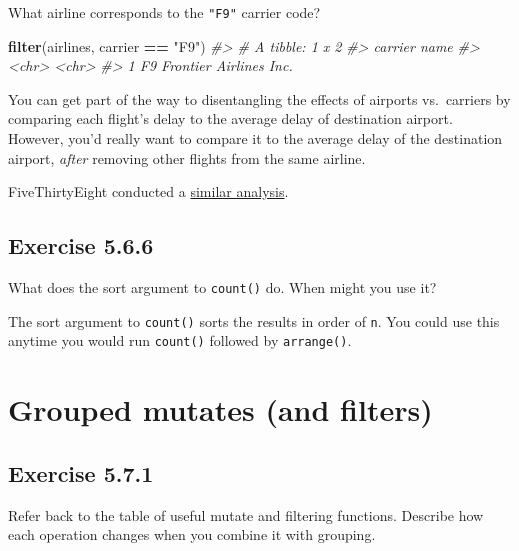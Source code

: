 \documentclass[]{book}
\newenvironment{Shaded}{\begin{snugshade}}{\end{snugshade}}
\newcommand{\CommentTok}[1]{\textcolor[rgb]{0.56,0.35,0.01}{\textit{#1}}}
\newcommand{\KeywordTok}[1]{\textcolor[rgb]{0.13,0.29,0.53}{\textbf{#1}}}
\newcommand{\NormalTok}[1]{#1}
\newcommand{\OperatorTok}[1]{\textcolor[rgb]{0.81,0.36,0.00}{\textbf{#1}}}
\newcommand{\StringTok}[1]{\textcolor[rgb]{0.31,0.60,0.02}{#1}}
\theoremstyle{plain}
\theoremstyle{remark}
\theoremstyle{definition}
\theoremstyle{definition}
\theoremstyle{definition}
\theoremstyle{remark}
\begin{document}
What airline corresponds to the \texttt{"F9"} carrier code?

\begin{Shaded}
\begin{Highlighting}[]
\KeywordTok{filter}\NormalTok{(airlines, carrier }\OperatorTok{==}\StringTok{ "F9"}\NormalTok{)}
\CommentTok{#> # A tibble: 1 x 2}
\CommentTok{#>   carrier name                  }
\CommentTok{#>   <chr>   <chr>                 }
\CommentTok{#> 1 F9      Frontier Airlines Inc.}
\end{Highlighting}
\end{Shaded}

You can get part of the way to disentangling the effects of airports
vs.~carriers by comparing each flight's delay to the average delay of
destination airport. However, you'd really want to compare it to the
average delay of the destination airport, \emph{after} removing other
flights from the same airline.

FiveThirtyEight conducted a
\href{http://fivethirtyeight.com/features/the-best-and-worst-airlines-airports-and-flights-summer-2015-update/}{similar
analysis}.

\hypertarget{exercise-5.6.6}{%
\subsection*{\texorpdfstring{Exercise
{5.6.6}}{Exercise 5.6.6}}\label{exercise-5.6.6}}

What does the sort argument to \texttt{count()} do. When might you use
it?

The sort argument to \texttt{count()} sorts the results in order of
\texttt{n}. You could use this anytime you would run \texttt{count()}
followed by \texttt{arrange()}.

\hypertarget{grouped-mutates-and-filters}{%
\section{Grouped mutates (and
filters)}\label{grouped-mutates-and-filters}}

\hypertarget{exercise-5.7.1}{%
\subsection*{\texorpdfstring{Exercise
{5.7.1}}{Exercise 5.7.1}}\label{exercise-5.7.1}}

Refer back to the table of useful mutate and filtering functions.
Describe how each operation changes when you combine it with grouping.
\end{document}
